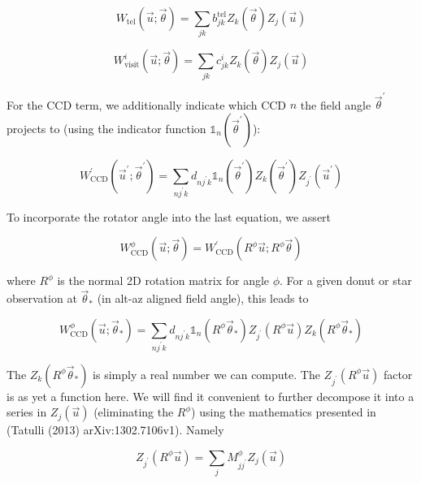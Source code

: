 \documentclass{article}
\begin{document}
\begin{equation}
    W_\mathrm{tel}\left(\vec{u}; \vec{\theta}\right) =
    \sum_{jk} b^\mathrm{tel}_{jk} Z_k(\vec{\theta}) Z_j(\vec{u})
    \label{eqn:Wtel}
\end{equation}

\begin{equation}
    W^i_\mathrm{visit}\left(\vec{u}; \vec{\theta}\right) =
    \sum_{jk} c^i_{jk} Z_k(\vec{\theta}) Z_j(\vec{u})
\end{equation}

For the CCD term, we additionally indicate which CCD $n$ the field angle
$\vec{\theta}^\prime$ projects to (using the indicator function
$\mathbb{1}_n(\vec{\theta}^\prime)$):

\begin{equation}
    W^\prime_\mathrm{CCD}\left(\vec{u}^\prime; \vec{\theta}^\prime\right) =
    \sum_{n j^\prime k} d_{n j^\prime k} \mathbb{1}_n(\vec{\theta}^\prime) Z_k(\vec{\theta}^\prime) Z_{j^\prime}(\vec{u}^\prime)
\end{equation}

To incorporate the rotator angle into the last equation, we assert

\begin{equation}
    W^\phi_\mathrm{CCD}\left(\vec{u}; \vec{\theta}\right) =
    W^\prime_\mathrm{CCD}\left(R^\phi\vec{u}; R^\phi\vec{\theta}\right)
\end{equation}

where $R^\phi$ is the normal 2D rotation matrix for angle $\phi$.  For a given
donut or star observation at $\vec{\theta}_\ast$ (in alt-az aligned field
angle), this leads to

\begin{equation}
    W^\phi_\mathrm{CCD}\left(\vec{u}; \vec{\theta}_\ast\right) =
    \sum_{n j^\prime k} d_{n j^\prime k} \mathbb{1}_n(R^\phi \vec{\theta}_\ast) Z_{j^\prime}(R^\phi \vec{u}) Z_k(R^\phi \vec{\theta}_\ast)
\end{equation}

The $Z_k(R^\phi \vec{\theta}_\ast)$ is simply a real number we can compute.  The
$Z_{j^\prime}(R^\phi \vec{u})$ factor is as yet a function here. We will find it
convenient to further decompose it into a series in $Z_j({\vec{u}})$
(eliminating the $R^\phi$) using the mathematics presented in (Tatulli (2013)
arXiv:1302.7106v1).  Namely

\begin{equation}
    Z_{j^\prime}(R^\phi \vec{u}) = \sum_{j} M_{j j^\prime}^\phi Z_{j}(\vec{u})
\end{equation}
\end{document}
